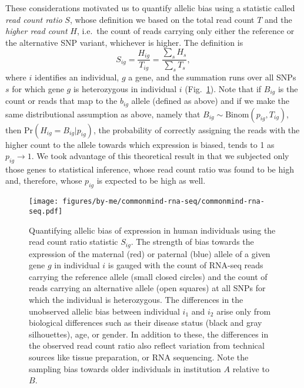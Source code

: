 \documentclass[12pt,letterpaper]{article}
\begin{document}
These considerations motivated us to quantify allelic bias using a statistic called
\emph{read count ratio} \(S\), whose definition we
based on the total read count \(T\) and the \emph{higher read count} \(H\),
i.e.~the count of reads carrying only either the reference or the alternative SNP variant,
whichever is higher.  The
definition is
\begin{equation}
S_{ig} = \frac{H_{ig}}{T_{ig}}= \frac{\sum_s H_s}{\sum_sT_s},
\label{eq:S-definition}
\end{equation}
where \(i\) identifies an individual, \(g\) a gene, and the summation runs
over all SNPs \(s\) for which gene \(g\) is heterozygous in individual \(i\) (Fig.~\ref{fig:study-design}).
Note that if \(B_{ig}\) is the count or reads that map to the \(b_{ig}\) allele
(defined as above) and if we make the same distributional assumption as above, namely that \(B_{ig}\sim
\mathrm{Binom}(p_{ig}, T_{ig})\), then \(\mathrm{Pr}(H_{ig}=B_{ig}|p_{ig})\), the probability of correctly
assigning the reads with the higher count to the allele towards which
expression is biased, tends to 1 as \(p_{ig} \rightarrow 1\).  We took
advantage of this theoretical result in that we subjected only those genes to
statistical inference, whose read count ratio was found to be high and,
therefore, whose \(p_{ig}\) is expected to be high as well.

\begin{figure} \begin{center}
\texttt{[image: figures/by-me/commonmind-rna-seq/commonmind-rna-seq.pdf]}
\end{center} \caption{ Quantifying allelic bias of expression in human
individuals using the read count ratio statistic \(S_{ig}\).  The strength of bias towards the
expression of the maternal (red) or paternal (blue) allele of a given gene
\(g\) in
individual \(i\) is gauged with the count of RNA-seq reads carrying the
reference allele (small closed circles) and the count of reads carrying an
alternative allele (open squares) at all SNPs for which the
individual is heterozygous.  The differences in the unobserved allelic
bias between individual \(i_1\) and \(i_2\) arise only from
biological differences such as their disease status (black and gray
silhouettes), age, or gender.  In addition to these, the differences in the
observed read count ratio also reflect variation from technical sources like
tissue preparation, or RNA sequencing.  Note the sampling bias towards older
individuals in institution \(A\) relative to \(B\). } \label{fig:study-design}
\end{figure}
\end{document}
